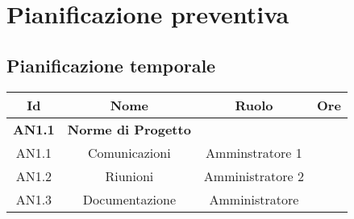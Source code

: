 \documentclass{scalatekids-article}
\begin{document}
\section{Pianificazione preventiva}
\subsection{Pianificazione temporale}
\begin{center}
  \begin{tabular}{| c | c | c | c |}
    \hline
    \textbf{Id} & \textbf{Nome} & \textbf{Ruolo} & \textbf{Ore}\\
    \hline
    \textbf{AN1.1} & \textbf{Norme di Progetto} & &\\
    \hline
    AN1.1 & Comunicazioni & Amminstratore 1 &\\
    \hline
    AN1.2 & Riunioni & Amministratore 2 &\\
    \hline
    AN1.3 & Documentazione & Amministratore &\\
    \hline
  \end{tabular}
\end{center}
\end{document}
